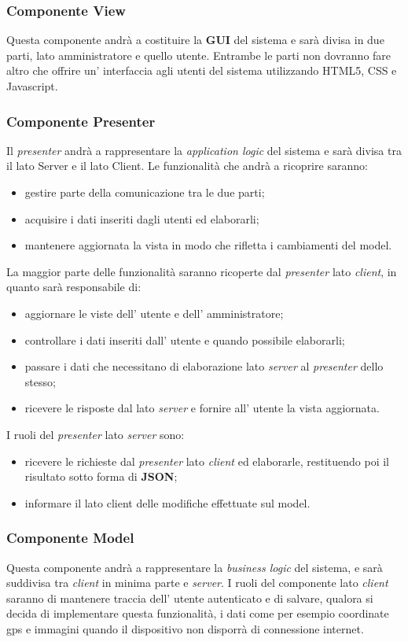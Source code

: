 \subsubsection{Componente View}
Questa componente andrà a costituire la \textbf{GUI} del sistema e sarà divisa in due parti, lato amministratore e quello utente. Entrambe le parti non dovranno fare altro che offrire un' interfaccia agli utenti del sistema utilizzando HTML5, CSS e Javascript.
\subsubsection{Componente Presenter}
Il \textit{presenter} andrà a rappresentare la \textit{application logic} del sistema e sarà divisa tra il lato Server e il lato Client. Le funzionalità che andrà a ricoprire saranno:
\begin{itemize}
	\item gestire parte della comunicazione tra le due parti;
	\item acquisire i dati inseriti dagli utenti ed elaborarli;
	\item mantenere aggiornata la vista in modo che rifletta i cambiamenti del model.
\end{itemize}
La maggior parte delle funzionalità saranno ricoperte dal \textit{presenter} lato \textit{client}, in quanto sarà responsabile di:
\begin{itemize}
	\item aggiornare le viste dell' utente e dell' amministratore;
	\item controllare i dati inseriti dall' utente e quando possibile elaborarli;
	\item passare i dati che necessitano di elaborazione lato \textit{server} al \textit{presenter} dello stesso;
	\item ricevere le risposte dal lato \textit{server} e fornire all' utente la vista aggiornata.
\end{itemize}
I ruoli del \textit{presenter} lato \textit{server} sono:
\begin{itemize}
 \item ricevere le richieste dal \textit{presenter} lato \textit{client} ed elaborarle, restituendo poi il risultato sotto forma di \textbf{JSON};
 \item informare il lato client delle modifiche effettuate sul model.
\end{itemize}
\subsubsection{Componente Model}
Questa componente andrà a rappresentare la \textit{business logic} del sistema, e sarà suddivisa tra \textit{client} in minima parte e \textit{server}.
I ruoli del componente lato \textit{client} saranno di mantenere traccia dell' utente autenticato e di salvare, qualora si decida di implementare questa funzionalità, i dati come per esempio coordinate gps e immagini quando il dispositivo non disporrà di connessione internet.